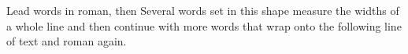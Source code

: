 \documentclass{article}
\begin{document}
Lead words in roman, then \textsf{Several words set in this shape measure the widths of a whole line and then continue with more words that wrap onto the following line of text} and roman again.
\end{document}
